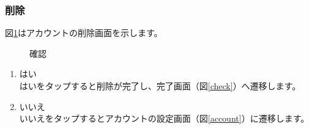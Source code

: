 \documentclass[a4j]{jarticle}
\begin{document}
\newpage
\subsubsection{削除}
図\ref{delete}はアカウントの削除画面を示します。\\

\begin{figure}[H]
    \begin{center}
    \caption {確認}
    \label{delete}
    \end{center}
\end{figure}

\begin{enumerate}
  \renewcommand{\labelenumi}{\textcircled{\scriptsize \theenumi}}
\item はい\\
  はいをタップすると削除が完了し、完了画面（図\ref{check}）へ遷移します。
\item いいえ\\
  いいえをタップするとアカウントの設定画面（図\ref{account}）に遷移します。
\end{enumerate}
\end{document}
